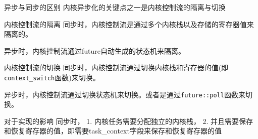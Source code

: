 \documentclass[
  ignorenonframetext,
]{beamer}
\begin{document}
\begin{frame}
\begin{block}{异步与同步的区别}
\label{ux5f02ux6b65ux4e0eux540cux6b65ux7684ux533aux522b}
内核异步化的关键点之一是内核控制流的隔离与切换
\end{block}
\end{frame}

\begin{frame}
\begin{block}{内核控制流的隔离}
\label{ux5185ux6838ux63a7ux5236ux6d41ux7684ux9694ux79bb}
同步时，内核控制流是通过多个内核栈以及存储的寄存器值来隔离的。

异步时，内核控制流通过future自动生成的状态机来隔离。
\end{block}
\end{frame}

\begin{frame}[fragile]
\begin{block}{内核控制流的切换}
\label{ux5185ux6838ux63a7ux5236ux6d41ux7684ux5207ux6362}
同步时，内核控制流通过切换内核栈和寄存器的值(即\texttt{context\_switch}函数)来切换。

异步时，内核控制流通过切换状态机来切换。或者是通过\texttt{future::poll}函数来切换。
\end{block}
\end{frame}

\begin{frame}
\begin{block}{对于实现的影响}
\label{ux5bf9ux4e8eux5b9eux73b0ux7684ux5f71ux54cd}
同步时， 1. 内核任务需要分配独立的内核栈， 2.
并且需要保存和恢复寄存器的值，即需要task\_context字段来保存和恢复寄存器的值
\end{block}
\end{frame}
\end{document}
